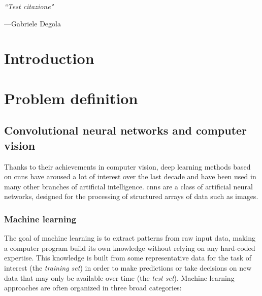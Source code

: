 \documentclass[%
    corpo=12pt,
    twoside,
    stile=classica,   
    tipotesi=magistrale,
    evenboxes,
    english,
	numerazioneromana,
]{toptesi}
\begin{document}

\ringraziamenti
\lipsum[1-2]

\newpage
\vspace*{1cm}
\epigraph{\itshape \textquotedblleft Test citazione"}{---Gabriele Degola}
\paginavuota

\indici

\mainmatter
\english

\chapter*{Introduction}
\lipsum[1-5]

\chapter{Problem definition}
\section{Convolutional neural networks and computer vision}
Thanks to their achievements in computer vision, deep learning methods based on \glspl{cnn} have aroused a lot of interest over the last decade and have been used in many other branches of artificial intelligence. \Glspl{cnn} are a class of artificial neural networks, designed for the processing of structured arrays of data such as images.

\subsection{Machine learning}
The goal of machine learning is to extract patterns from raw input data, making a computer program build its own knowledge without relying on any hard-coded expertise. This knowledge is built from some representative data for the task of interest (the \textit{training set}) in order to make predictions or take decisions on new data that may only be available over time (the \textit{test set}). Machine learning approaches are often organized in three broad categories:
\end{document}
